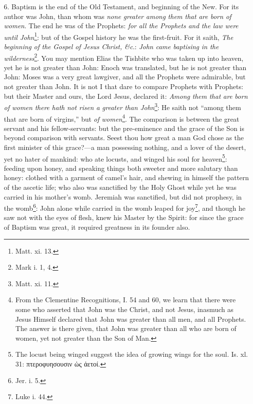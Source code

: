 6. Baptism is the end of the Old Testament, and beginning of the New. For its author was John, than whom was \emph{none greater among them that are born of women}. The end he was of the Prophets: \emph{for all the Prophets and the law were until John}\footnote{Matt. xi. 13.}: but of the Gospel history he was the first-fruit. For it saith, \emph{The beginning of the Gospel of Jesus Christ, \&c}.: \emph{John came baptising in the wilderness}\footnote{Mark i. 1, 4.}. You may mention Elias the Tishbite who was taken up into heaven, yet he is not greater than John: Enoch was translated, but he is not greater than John: Moses was a very great lawgiver, and all the Prophets were admirable, but not greater than John. It is not I that dare to compare Prophets with Prophets: but their Master and ours, the Lord Jesus, declared it: \emph{Among them that are born of women there hath not risen a greater than John}\footnote{Matt. xi. 11.}: He saith not “among them that are born of virgins,” but \emph{of women}\footnote{From the Clementine Recognitions, I. 54 and 60, we learn that there were some who asserted that John was the Christ, and not Jesus, inasmuch as Jesus Himself declared that John was greater than all men, and all Prophets. The answer is there given, that John was greater than all who are born of women, yet not greater than the Son of Man.}. The comparison is between the great servant and his fellow-servants: but the pre-eminence and the grace of the Son is beyond comparison with servants. Seest thou how great a man God chose as the first minister of this grace?—a man possessing nothing, and a lover of the desert, yet no hater of mankind: who ate locusts, and winged his soul for heaven\footnote{The locust being winged suggest the idea of growing wings for the soul. Is. xl. 31: \textgreek{πτεροφυησουσιν ὡς ἀετοί}.}: feeding upon honey, and speaking things both sweeter and more salutary than honey: clothed with a garment of camel’s hair, and shewing in himself the pattern of the ascetic life; who also was sanctified by the Holy Ghost while yet he was carried in his mother’s womb. Jeremiah was sanctified, but did not prophesy, in the womb\footnote{Jer. i. 5.}: John alone while carried in the womb leaped for joy\footnote{Luke i. 44.}, and though he saw not with the eyes of flesh, knew his Master by the Spirit: for since the grace of Baptism was great, it required greatness in its founder also.

